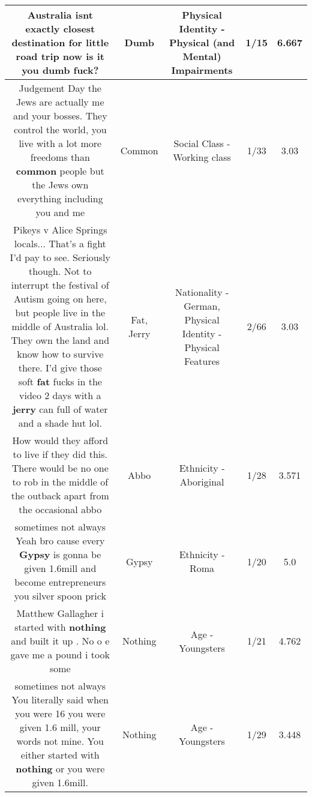\documentclass[11pt]{article}
\newlength\mylength
\begin{document}
\begin{center}
\begin{longtable}{|C{.65\mylength}|C{.30\mylength}|C{.12\mylength}|C{.12\mylength}|C{.12\mylength}|}
  \small Australia isnt exactly closest destination for little road trip now is it you \textbf{dumb} fuck?\normalsize   & Dumb & Physical Identity - Physical (and Mental) Impairments & 1/15 & 6.667 \\  \hline
  \small Judgement Day the Jews are actually me and your bosses. They control the world, you live with a lot more freedoms than \textbf{common} people but the Jews own everything including you and me\normalsize   & Common & Social Class - Working class & 1/33 & 3.03 \\  \hline
  \small Pikeys v Alice Springs locals...  That's a fight I'd pay to see.    Seriously though. Not to interrupt the festival of Autism going on here, but people live in the middle of Australia lol. They own the land and know how to survive there. I'd give those soft \textbf{fat} fucks in the video 2 days with a \textbf{jerry} can full of water and a shade hut lol.\normalsize   & Fat, Jerry & Nationality - German, Physical Identity - Physical Features & 2/66 & 3.03 \\  \hline
  \small How would they afford to live if they did this. There would be no one to rob in the middle of the outback apart from the occasional abbo\normalsize   & Abbo & Ethnicity - Aboriginal & 1/28 & 3.571 \\  \hline
  \small sometimes not always Yeah bro cause every \textbf{Gypsy} is gonna be given 1.6mill and become entrepreneurs you silver spoon prick\normalsize   & Gypsy & Ethnicity - Roma & 1/20 & 5.0 \\  \hline
  \small Matthew Gallagher i started with \textbf{nothing} and built it up . No o e gave me a pound i took some\normalsize   & Nothing & Age - Youngsters & 1/21 & 4.762 \\  \hline
  \small sometimes not always You literally said when you were 16 you were given 1.6 mill, your words not mine. You either started with \textbf{nothing} or you were given 1.6mill.\normalsize   & Nothing & Age - Youngsters & 1/29 & 3.448 \\  \hline

\end{longtable}
\end{center}
\end{document}
